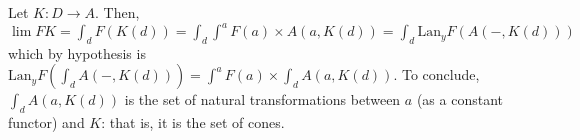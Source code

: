 \documentclass{article}
\newcommand{\Lan}{\text{Lan}}
\newcommand{\Set}{\text{Set}}
\newtheorem{remark}[theorem]{Remark}
\begin{document}
  Let $K : D \rightarrow A$.
  Then, $\lim F K = \int_d F(K(d)) = \int_d\int^a F(a)\times  A(a, K(d)) =
  \int_d \Lan_yF( A(-, K(d)))$ which by hypothesis is
  $ \Lan_yF(\int_dA(-,K(d)))=\int^a F(a)\times \int_dA(a, K(d))$.
  To conclude,
  $\int_dA(a,K(d))$ is the set of natural transformations between
  $a$ (as a constant functor) and $K$: that is, it is the set of cones.
\end{document}
